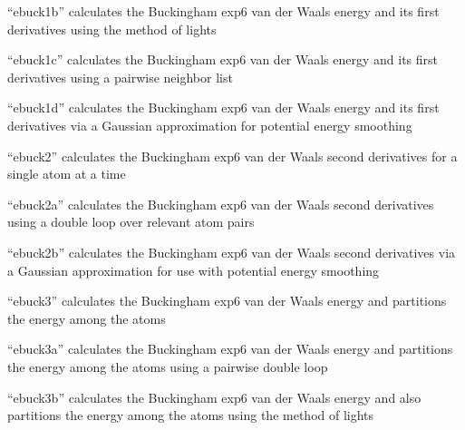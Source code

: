 \documentclass[letterpaper,11pt,english]{sphinxmanual}
\begin{document}
\sphinxAtStartPar
{}

\sphinxAtStartPar
“ebuck1b” calculates the Buckingham exp\sphinxhyphen{}6 van der Waals energy and its first derivatives using the method of lights

\sphinxAtStartPar
{}

\sphinxAtStartPar
“ebuck1c” calculates the Buckingham exp\sphinxhyphen{}6 van der Waals energy and its first derivatives using a pairwise neighbor list

\sphinxAtStartPar
{}

\sphinxAtStartPar
“ebuck1d” calculates the Buckingham exp\sphinxhyphen{}6 van der Waals energy and its first derivatives via a Gaussian approximation for potential energy smoothing

\sphinxAtStartPar
{}

\sphinxAtStartPar
“ebuck2” calculates the Buckingham exp\sphinxhyphen{}6 van der Waals second derivatives for a single atom at a time

\sphinxAtStartPar
{}

\sphinxAtStartPar
“ebuck2a” calculates the Buckingham exp\sphinxhyphen{}6 van der Waals second derivatives using a double loop over relevant atom pairs

\sphinxAtStartPar
{}

\sphinxAtStartPar
“ebuck2b” calculates the Buckingham exp\sphinxhyphen{}6 van der Waals second derivatives via a Gaussian approximation for use with potential energy smoothing

\sphinxAtStartPar
{}

\sphinxAtStartPar
“ebuck3” calculates the Buckingham exp\sphinxhyphen{}6 van der Waals energy and partitions the energy among the atoms

\sphinxAtStartPar
{}

\sphinxAtStartPar
“ebuck3a” calculates the Buckingham exp\sphinxhyphen{}6 van der Waals energy and partitions the energy among the atoms using a pairwise double loop

\sphinxAtStartPar
{}

\sphinxAtStartPar
“ebuck3b” calculates the Buckingham exp\sphinxhyphen{}6 van der Waals energy and also partitions the energy among the atoms using the method of lights
\end{document}
